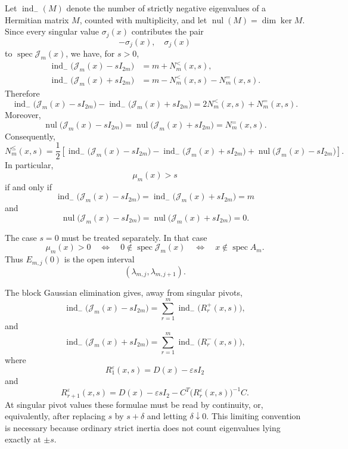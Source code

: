 \documentclass[11pt]{amsart}
\numberwithin{equation}{section}
\DeclareMathOperator{\spec}{spec}
\DeclareMathOperator{\ind}{ind}
\DeclareMathOperator{\nul}{nul}
\begin{document}
Let \(\ind_-(M)\) denote the number of strictly negative eigenvalues of a
Hermitian matrix \(M\), counted with multiplicity, and let
\(\nul(M)=\dim\ker M\).  Since every singular value \(\sigma_j(x)\) contributes
the pair
\[
        -\sigma_j(x),\quad \sigma_j(x)
\]
to \(\spec\mathcal J_m(x)\), we have, for \(s>0\),
\[
\begin{aligned}
        \ind_-\bigl(\mathcal J_m(x)-sI_{2m}\bigr)
        &=
        m+N_m^{<}(x,s),\\
        \ind_-\bigl(\mathcal J_m(x)+sI_{2m}\bigr)
        &=
        m-N_m^{<}(x,s)-N_m^{=}(x,s).
\end{aligned}
\]
Therefore
\[
        \ind_-\bigl(\mathcal J_m(x)-sI_{2m}\bigr)
        -
        \ind_-\bigl(\mathcal J_m(x)+sI_{2m}\bigr)
        =
        2N_m^{<}(x,s)+N_m^{=}(x,s).
\]
Moreover,
\[
        \nul\bigl(\mathcal J_m(x)-sI_{2m}\bigr)
        =
        \nul\bigl(\mathcal J_m(x)+sI_{2m}\bigr)
        =
        N_m^{=}(x,s).
\]
Consequently,
\[
        N_m^{\le}(x,s)
        =
        \frac12
        \left[
        \ind_-\bigl(\mathcal J_m(x)-sI_{2m}\bigr)
        -
        \ind_-\bigl(\mathcal J_m(x)+sI_{2m}\bigr)
        +
        \nul\bigl(\mathcal J_m(x)-sI_{2m}\bigr)
        \right].
\]
In particular,
\[
        \mu_m(x)>s
\]
if and only if
\[
        \ind_-\bigl(\mathcal J_m(x)-sI_{2m}\bigr)
        =
        \ind_-\bigl(\mathcal J_m(x)+sI_{2m}\bigr)
        =
        m
\]
and
\[
        \nul\bigl(\mathcal J_m(x)-sI_{2m}\bigr)
        =
        \nul\bigl(\mathcal J_m(x)+sI_{2m}\bigr)
        =
        0.
\]

The case \(s=0\) must be treated separately.  In that case
\[
        \mu_m(x)>0
        \quad\Longleftrightarrow\quad
        0\notin\spec\mathcal J_m(x)
        \quad\Longleftrightarrow\quad
        x\notin\spec A_m.
\]
Thus \(E_{m,j}(0)\) is the open interval
\[
        (\lambda_{m,j},\lambda_{m,j+1}).
\]

The block Gaussian elimination gives, away from singular pivots,
\[
        \ind_-\bigl(\mathcal J_m(x)-sI_{2m}\bigr)
        =
        \sum_{r=1}^{m}\ind_-\bigl(R_r^{+}(x,s)\bigr),
\]
and
\[
        \ind_-\bigl(\mathcal J_m(x)+sI_{2m}\bigr)
        =
        \sum_{r=1}^{m}\ind_-\bigl(R_r^{-}(x,s)\bigr),
\]
where
\[
        R_1^{\varepsilon}(x,s)
        =
        D(x)-\varepsilon sI_2
\]
and
\[
        R_{r+1}^{\varepsilon}(x,s)
        =
        D(x)-\varepsilon sI_2
        -
        C^T\bigl(R_r^{\varepsilon}(x,s)\bigr)^{-1}C.
\]
At singular pivot values these formulae must be read by continuity, or,
equivalently, after replacing \(s\) by \(s+\delta\) and letting
\(\delta\downarrow0\).  This limiting convention is necessary because
ordinary strict inertia does not count eigenvalues lying exactly at
\(\pm s\).
\end{document}
